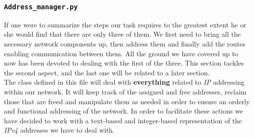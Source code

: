 \subsubsection{\texttt{Address\_manager.py}}
    If one were to summarize the steps our task requires to the greatest extent he or she would find that there are only three of them. We first need to bring all the necessary network components up, then address them and finally add the routes enabling communication between them. All the ground we have covered up to now has been devoted to dealing with the first of the three. This section tackles the second aspect, and the last one will be related to a later section.\\

    The class defined in this file will deal with \textbf{everything} related to \textit{IP} addressing within our network. It will keep track of the assigned and free addresses, reclaim those that are freed and manipulate them as needed in order to ensure an orderly and functional addressing of the network. In order to facilitate these actions we have decided to work with a text-based and integer-based representation of the \textit{IPv4} addresses we have to deal with.\\

